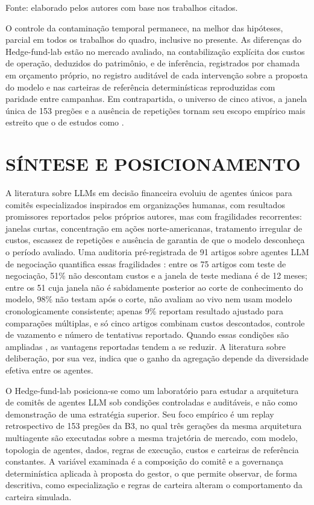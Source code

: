 \begin{table}[htbp]
\vspace{2pt}
{\footnotesize Fonte: elaborado pelos autores com base nos trabalhos citados.}
\end{table}

O controle da contaminação temporal permanece, na melhor das hipóteses, parcial em todos os trabalhos do quadro, inclusive no presente. As diferenças do Hedge-fund-lab estão no mercado avaliado, na contabilização explícita dos custos de operação, deduzidos do patrimônio, e de inferência, registrados por chamada em orçamento próprio, no registro auditável de cada intervenção sobre a proposta do modelo e nas carteiras de referência determinísticas reproduzidas com paridade entre campanhas. Em contrapartida, o universo de cinco ativos, a janela única de 153 pregões e a ausência de repetições tornam seu escopo empírico mais estreito que o de estudos como \citet{FINSABER2026}.

\section{SÍNTESE E POSICIONAMENTO}

A literatura sobre LLMs em decisão financeira evoluiu de agentes únicos para comitês especializados inspirados em organizações humanas, com resultados promissores reportados pelos próprios autores, mas com fragilidades recorrentes: janelas curtas, concentração em ações norte-americanas, tratamento irregular de custos, escassez de repetições e ausência de garantia de que o modelo desconheça o período avaliado. Uma auditoria pré-registrada de 91 artigos sobre agentes LLM de negociação quantifica essas fragilidades \citep{Zhang2026}: entre os 75 artigos com teste de negociação, 51\% não descontam custos e a janela de teste mediana é de 12 meses; entre os 51 cuja janela não é sabidamente posterior ao corte de conhecimento do modelo, 98\% não testam após o corte, não avaliam ao vivo nem usam modelo cronologicamente consistente; apenas 9\% reportam resultado ajustado para comparações múltiplas, e só cinco artigos combinam custos descontados, controle de vazamento e número de tentativas reportado. Quando essas condições são ampliadas \citep{FINSABER2026}, as vantagens reportadas tendem a se reduzir. A literatura sobre deliberação, por sua vez, indica que o ganho da agregação depende da diversidade efetiva entre os agentes.

O Hedge-fund-lab posiciona-se como um laboratório para estudar a arquitetura de comitês de agentes LLM sob condições controladas e auditáveis, e não como demonstração de uma estratégia superior. Seu foco empírico é um replay retrospectivo de 153 pregões da B3, no qual três gerações da mesma arquitetura multiagente são executadas sobre a mesma trajetória de mercado, com modelo, topologia de agentes, dados, regras de execução, custos e carteiras de referência constantes. A variável examinada é a composição do comitê e a governança determinística aplicada à proposta do gestor, o que permite observar, de forma descritiva, como especialização e regras de carteira alteram o comportamento da carteira simulada.

